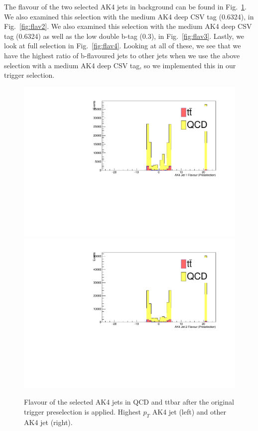 The flavour of the two selected AK4 jets in background can be found in Fig.~\ref{fig:flav1}. We also examined this selection with the medium AK4 deep CSV tag (0.6324), in Fig.~\ref{fig:flav2}. We also examined this selection with the medium AK4 deep CSV tag (0.6324) as well as the low double b-tag (0.3), in Fig.~\ref{fig:flav3}. Lastly, we look at full selection in Fig.~\ref{fig:flav4}. Looking at all of these, we see that we have the highest ratio of b-flavoured jets to other jets when we use the above selection with a medium AK4 deep CSV tag, so we implemented this in our trigger selection.

\begin{figure}[thb!]
\begin{center}
\includegraphics[scale=0.35]{Figures/checkpreflavAK1PS.pdf}
\includegraphics[scale=0.35]{Figures/checkpreflavAK2PS.pdf}
\end{center}
\caption{Flavour of the selected AK4 jets in QCD and ttbar after the original trigger preselection is applied. Highest $p_{T}$ AK4 jet (left) and other AK4 jet (right).}
\label{fig:flav1}
\end{figure}

